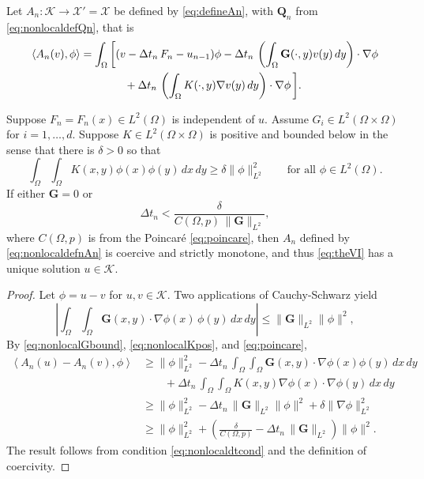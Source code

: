 \documentclass[final,onefignum]{siamart190516}
\newcommand\bG{\mathbf{G}}
\newcommand\bQ{\mathbf{Q}}
\newcommand{\grad}{\nabla}
\newcommand{\ip}[2]{\ensuremath{\left<#1,#2\right>}}
\begin{document}
Let $A_n:\mathcal{K} \to \mathcal{X}'=\mathcal{X}$ be defined by \eqref{eq:defineAn}, with $\bQ_n$ from \eqref{eq:nonlocaldefQn}, that is
\begin{align}
    \ip{A_n(v)}{\phi} &= \int_\Omega \bigg[(v - \Delta t_n\,F_n - u_{n-1})\phi - \Delta t_n\,\left(\int_\Omega \bG(\cdot,y) v(y)\,dy\right)\cdot \grad \phi \label{eq:nonlocaldefnAn} \\
                      &\qquad\qquad + \Delta t_n\,\left(\int_\Omega K(\cdot,y) \grad v(y)\,dy\right)\cdot \grad \phi\,\bigg]. \notag
\end{align}

\begin{theorem}  \label{thm:nonlocalwellposed}  Suppose $F_n=F_n(x) \in L^2(\Omega)$ is independent of $u$.  Assume $G_i \in L^2(\Omega\times\Omega)$ for $i=1,\dots,d$.  Suppose $K \in L^2(\Omega\times\Omega)$ is positive and bounded below in the sense that there is $\delta>0$ so that
\begin{equation}
   \int_\Omega \int_\Omega K(x,y) \phi(x) \phi(y)\,dx\,dy \ge \delta \|\phi\|_{L^2}^2 \qquad \text{for all } \phi \in L^2(\Omega).  \label{eq:nonlocalKpos}
\end{equation}
If either $\bG=0$ or
\begin{equation}
  \Delta t_n < \frac{\delta}{C(\Omega,p)\, \|\bG\|_{L^2}},  \label{eq:nonlocaldtcond}
\end{equation}
where $C(\Omega,p)$ is from the Poincar\'e \eqref{eq:poincare}, then $A_n$ defined by \eqref{eq:nonlocaldefnAn} is coercive and strictly monotone, and thus \eqref{eq:theVI} has a unique solution $u\in\mathcal{K}$.
\end{theorem}

\begin{proof}  Let $\phi=u-v$ for $u,v\in\mathcal{K}$.  Two applications of Cauchy-Schwarz yield
\begin{equation}
\left|\int_\Omega \int_\Omega \bG(x,y) \cdot \grad \phi(x)\,\phi(y) \,dx\,dy\right|
  \le \|\bG\|_{L^2} \|\phi\|^2,   \label{eq:nonlocalGbound}
\end{equation}
By \eqref{eq:nonlocalGbound}, \eqref{eq:nonlocalKpos}, and \eqref{eq:poincare},
\begin{align*}
\ip{A_n(u)-A_n(v)}{\phi} &\ge \|\phi\|_{L^2}^2 - \Delta t_n\,\int_\Omega \int_\Omega \bG(x,y) \cdot \grad \phi(x) \phi(y)\,dx\,dy \\
    &\qquad + \Delta t_n\,\int_\Omega \int_\Omega K(x,y) \grad \phi(x) \cdot \grad \phi(y)\,dx\,dy \\
    &\ge \|\phi\|_{L^2}^2 - \Delta t_n\,\|\bG\|_{L^2} \|\phi\|^2 + \delta \|\grad\phi\|_{L^2}^2 \\
    &\ge \|\phi\|_{L^2}^2 + \left(\frac{\delta}{C(\Omega,p)} - \Delta t_n\,\|\bG\|_{L^2}\right) \|\phi\|^2.
\end{align*}
The result follows from condition \eqref{eq:nonlocaldtcond} and the definition of coercivity. \end{proof}
\end{document}
